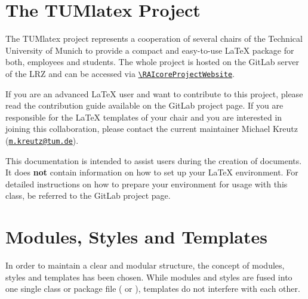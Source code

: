 \section{The TUMlatex Project}%
\label{sec:frontmatter_TUMlatex_project}%
The TUMlatex project represents a cooperation of several chairs of the Technical University of Munich to provide a compact and easy-to-use LaTeX package for both, employees and students. The whole project is hosted on the GitLab server of the LRZ and can be accessed via \texttt{\url{\RAIcoreProjectWebsite}}.\par%
%
If you are an advanced LaTeX user and want to contribute to this project, please read the contribution guide available on the GitLab project page. If you are responsible for the LaTeX templates of your chair and you are interested in joining this collaboration, please contact the current maintainer Michael Kreutz (\href{mailto:m.kreutz@tum.de}{\texttt{m.kreutz@tum.de}}).\par%
%
This documentation is intended to assist users during the creation of documents. It does \textbf{not} contain information on how to set up your LaTeX environment. For detailed instructions on how to prepare your environment for usage with this class, be referred to the GitLab project page.\par%
%
%
\section{Modules, Styles and Templates}%
\label{sec:frontmatter_modules_styles_templates}%
In order to maintain a clear and modular structure, the concept of modules, styles and templates has been chosen. While modules and styles are fused into one single class or package file ( or ), templates do not interfere with each other.\par%
%
